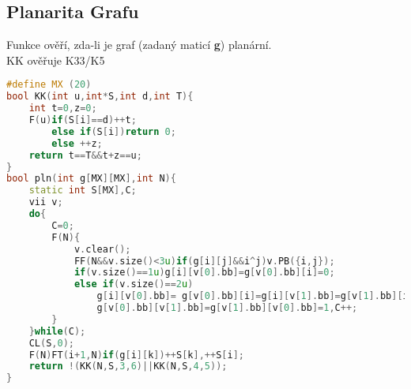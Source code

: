 \documentclass[11pt]{article}
\begin{document}
\subsection{Planarita Grafu}
Funkce ověří, zda-li je graf (zadaný maticí \textbf{g}) planární. 
\\KK ověřuje K33/K5
\begin{lstlisting}[language=C++]
#define MX (20)
bool KK(int u,int*S,int d,int T){
    int t=0,z=0;
    F(u)if(S[i]==d)++t;
        else if(S[i])return 0;
        else ++z;
    return t==T&&t+z==u;
}
bool pln(int g[MX][MX],int N){
    static int S[MX],C;
    vii v;
    do{
        C=0;
        F(N){
            v.clear();
            FF(N&&v.size()<3u)if(g[i][j]&&i^j)v.PB({i,j});
            if(v.size()==1u)g[i][v[0].bb]=g[v[0].bb][i]=0;
            else if(v.size()==2u)
                g[i][v[0].bb]= g[v[0].bb][i]=g[i][v[1].bb]=g[v[1].bb][i]=0,
                g[v[0].bb][v[1].bb]=g[v[1].bb][v[0].bb]=1,C++;
        }
    }while(C);
    CL(S,0);
    F(N)FT(i+1,N)if(g[i][k])++S[k],++S[i];
    return !(KK(N,S,3,6)||KK(N,S,4,5));
}
\end{lstlisting}
\end{document}
